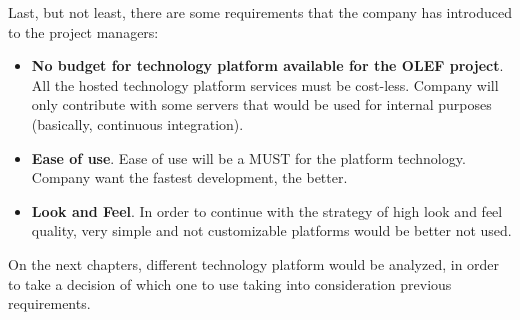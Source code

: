 \documentclass[11pt]{article}
\begin{document}
Last, but not least, there are some requirements that the company has introduced to the project managers:
\begin{itemize}\itemsep0pt
\item{\textbf{No budget for technology platform available for the OLEF project}}. All the hosted technology platform services must be cost-less. Company will only contribute with some servers that would be used for internal purposes (basically, continuous integration).
\item{\textbf{Ease of use}}. Ease of use will be a MUST for the platform technology. Company want the fastest development, the better.
\item{\textbf{Look and Feel}}. In order to continue with the strategy of high look and feel quality, very simple and not customizable platforms would be better not used.
\end{itemize}
On the next chapters, different technology platform would be analyzed, in order to take a decision of which one to use taking into consideration previous requirements.
\end{document}
